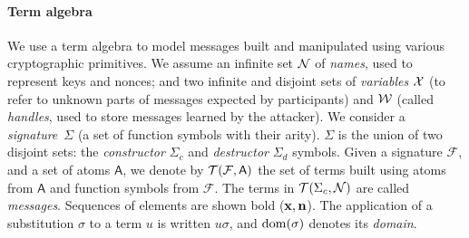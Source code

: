 \paragraph{\textbf{Term algebra}}
\label{subsec:term}
We use a term algebra to model messages
built and manipulated using various cryptographic primitives.
We assume an infinite set $\mathcal{N}$ of \emph{names}, used to represent
keys and nonces; and two infinite and disjoint sets of \emph{variables}
$\mathcal{X}$ (to refer to unknown parts of messages expected
by participants) and $\mathcal{W}$ (called {\em handles}, used to store messages learned by the attacker).
%
We consider a \emph{signature}~$\Sigma$ (\ie a set of function
symbols with their arity). $\Sigma$ is the union
of two disjoint sets:
the \emph{constructor} $\Sigma_c$ and \emph{destructor} $\Sigma_d$ symbols.
%
Given a signature $\mathcal{F}$, and a set of atoms 
$\mathsf{A}$, we denote by $\mathcal{T}(\mathcal{F},\mathsf{A})$ the set of terms built
using atoms from $\mathsf{A}$ and function symbols from $\mathcal{F}$.
The terms in $\mathcal{T}(\Sigma_c, \mathcal{N})$ are called {\em messages}.
Sequences of elements are shown bold (\eg ${\mathbf{x}},{\mathbf{n}}$).
The application of a substitution $\sigma$ to a term $u$ is written
$u\sigma$, and $\mathrm{dom}(\sigma)$ denotes its \emph{domain}.

